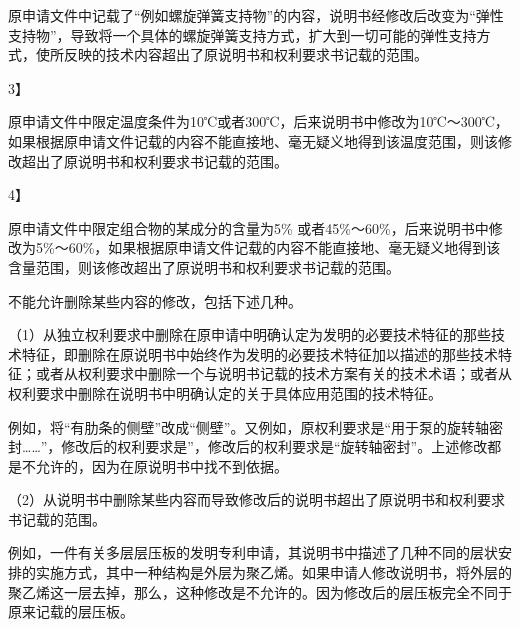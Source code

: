 原申请文件中记载了“例如螺旋弹簧支持物”的内容，说明书经修改后改变为“弹性支持物”，导致将一个具体的螺旋弹簧支持方式，扩大到一切可能的弹性支持方式，使所反映的技术内容超出了原说明书和权利要求书记载的范围。

{3{\kaiti 】}\par}

原申请文件中限定温度条件为10℃或者300℃，后来说明书中修改为10℃～300℃，如果根据原申请文件记载的内容不能直接地、毫无疑义地得到该温度范围，则该修改超出了原说明书和权利要求书记载的范围。

{4{\kaiti 】}\par}

原申请文件中限定组合物的某成分的含量为5\% 或者45\%～60\%，后来说明书中修改为5\%～60\%，如果根据原申请文件记载的内容不能直接地、毫无疑义地得到该含量范围，则该修改超出了原说明书和权利要求书记载的范围。

不能允许删除某些内容的修改，包括下述几种。

{\setlength{\parindent}{17.1bp}（1）从独立权利要求中删除在原申请中明确认定为发明的必要技术特征的那些技术特征，即删除在原说明书中始终作为发明的必要技术特征加以描述的那些技术特征；或者从权利要求中删除一个与说明书记载的技术方案有关的技术术语；或者从权利要求中删除在说明书中明确认定的关于具体应用范围的技术特征。\par}

例如，将“有肋条的侧壁”改成“侧壁”。又例如，原权利要求是“用于泵的旋转轴密封……”，修改后的权利要求是”，修改后的权利要求是“旋转轴密封”。上述修改都是不允许的，因为在原说明书中找不到依据。

{\setlength{\parindent}{17.1bp}（2）从说明书中删除某些内容而导致修改后的说明书超出了原说明书和权利要求书记载的范围。\par}

例如，一件有关多层层压板的发明专利申请，其说明书中描述了几种不同的层状安排的实施方式，其中一种结构是外层为聚乙烯。如果申请人修改说明书，将外层的聚乙烯这一层去掉，那么，这种修改是不允许的。因为修改后的层压板完全不同于原来记载的层压板。

